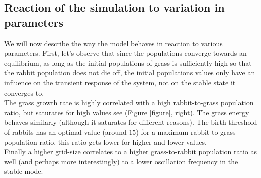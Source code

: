 \documentclass[11pt]{article}
\begin{document}

\subsection{Reaction of the simulation to variation in parameters}

We will now describe the way the model behaves in reaction to various parameters. First, let's observe that since the populations converge towards an equilibrium, as long as the initial populations of grass is sufficiently high so that the rabbit population does not die off, the initial populations values only have an influence on the transient response of the system, not on the stable state it converges to. \\

The grass growth rate is highly correlated with a high rabbit-to-grass population ratio, but saturates for high values see (Figure \ref{figure}, right). The grass energy behaves similarly (although it saturates for different reasons). The birth threshold of rabbits has an optimal value (around $15$) for a maximum rabbit-to-grass population ratio, this ratio gets lower for higher and lower values. \\

Finally a higher grid-size correlates to a higher grass-to-rabbit population ratio as well (and perhaps more interestingly) to a lower oscillation frequency in the stable mode.
\end{document}
